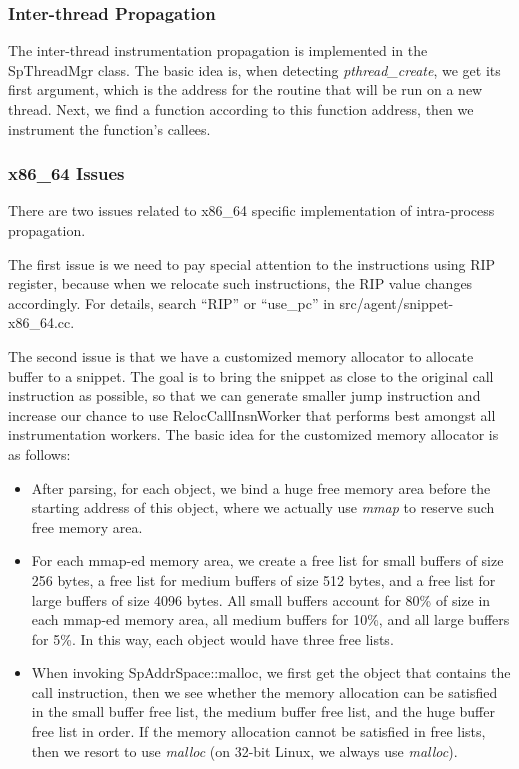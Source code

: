 \subsubsection{Inter-thread Propagation}

The inter-thread instrumentation propagation is implemented in the SpThreadMgr
class. The basic idea is, when detecting {\em pthread\_create}, we get its first
argument, which is the address for the routine that will be run on a new thread.
Next, we find a function according to this function address, then we instrument
the function's callees.


\subsubsection{x86\_64 Issues}
There are two issues related to x86\_64 specific implementation of intra-process
propagation.

The first issue is we need to pay special attention to the instructions using
RIP register, because when we relocate such instructions, the RIP value changes
accordingly. For details, search ``RIP'' or ``use\_pc'' in
src/agent/snippet-x86\_64.cc.

The second issue is that we have a customized memory allocator to allocate
buffer to a snippet. The goal is to bring the snippet as close to the original
call instruction as possible, so that we can generate smaller jump instruction
and increase our chance to use RelocCallInsnWorker that performs best amongst
all instrumentation workers. The basic idea for the customized memory allocator
is as follows:
\begin{itemize}
\item After parsing, for each object, we bind a huge free memory area before the
  starting address of this object, where we actually use {\em mmap} to reserve
  such free memory area.
\item For each mmap-ed memory area, we create a free list for small buffers of
  size 256 bytes, a free list for medium buffers of size 512 bytes, and a free
  list for large buffers of size 4096 bytes. All small buffers account for 80\%
  of size in each mmap-ed memory area, all medium buffers for 10\%, and all
  large buffers for 5\%. In this way, each object would have three free lists.
\item When invoking SpAddrSpace::malloc, we first get the object that contains
  the call instruction, then we see whether the memory allocation can be
  satisfied in the small buffer free list, the medium buffer free list, and the
  huge buffer free list in order. If the memory allocation cannot be satisfied
  in free lists, then we resort to use {\em malloc} (on 32-bit Linux, we always
  use {\em malloc}).
\end{itemize}

